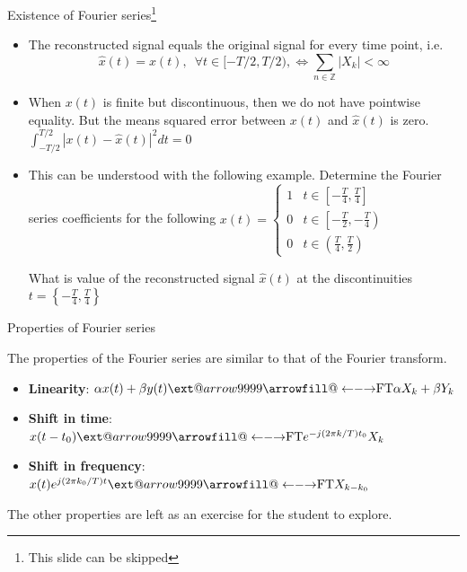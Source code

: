 \documentclass{beamer}
\makeatletter
\newcommand\xleftrightarrow[2][]{%
  \ext@arrow 9999{\longleftrightarrowfill@}{#1}{#2}}
\newcommand\longleftrightarrowfill@{%
  \arrowfill@\leftarrow\relbar\rightarrow}
\makeatother
\begin{document}
\begin{frame}{Existence of Fourier series\footnote{This slide can be skipped}}

\begin{itemize}
\item The reconstructed signal equals the original signal for every time point, i.e.
\[ \hat{x}(t) = x(t), \,\,\, \forall t \in [-T/2, T/2), \iff \sum_{n\in\mathbb{Z}} \left|X_k\right| < \infty \]

\item When  $x(t)$ is finite but discontinuous, then we do not have pointwise equality. But the means squared error between $x(t)$ and $\hat{x}(t)$ is zero. $\int_{-T/2}^{T/2}\left|x(t) - \hat{x}(t)\right|^2dt = 0$

\item This can be understood with the following example. Determine the Fourier series coefficients for the following $x(t) = \begin{cases}
1 & t \in \left[-\frac{T}{4}, \frac{T}{4}\right] \\
0 & t \in \left[\left.-\frac{T}{2}, -\frac{T}{4}\right.\right) \\
0 & t \in \left(\frac{T}{4}, \frac{T}{2}\right)
\end{cases}$

What is value of the reconstructed signal $\hat{x}(t)$ at the discontinuities $t = \left\{-\frac{T}{4}, \frac{T}{4}\right\}$
\end{itemize}

\end{frame}

\begin{frame}{Properties of Fourier series}

The properties of the Fourier series are similar to that of the Fourier transform.

\begin{itemize}
\item \textbf{Linearity}: $\alpha x(t) + \beta y(t) \xleftrightarrow{\text{FT}} \alpha X_k + \beta Y_k$
\item \textbf{Shift in time}: $ x(t-t_0) \xleftrightarrow{\text{FT}} e^{-j(2\pi k/T)t_0}X_k$
\item \textbf{Shift in frequency}: $ x(t)e^{j(2\pi k_0/T)t} \xleftrightarrow{\text{FT}} X_{k-k_0} $
\end{itemize}

The other properties are left as an exercise for the student to explore.

\end{frame}
\end{document}
